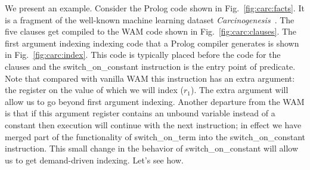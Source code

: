 \documentclass{llncs}
\newcommand{\instr}[1]{\textsf{#1}}
\newcommand{\switchONterm}{\mbox{\instr{switch\_on\_term}}\xspace}
\newcommand{\switchONconstant}{\mbox{\instr{switch\_on\_constant}}\xspace}
\newcommand{\JITI}{demand-driven indexing\xspace}
\begin{document}
We present an example. Consider the Prolog code shown in
Fig.~\ref{fig:carc:facts}. It is a fragment of the well-known machine
learning dataset \textit{Carcinogenesis}~\cite{Carcinogenesis@ILP-97}.
The five clauses get compiled to the WAM code shown in
Fig.~\ref{fig:carc:clauses}. The first argument indexing indexing code
that a Prolog compiler generates is shown in
Fig.~\ref{fig:carc:index}. This code is typically placed before the
code for the clauses and the \switchONconstant instruction is the
entry point of predicate. Note that compared with vanilla WAM this
instruction has an extra argument: the register on the value of which
we will index ($r_1$). The extra argument will allow us to go beyond
first argument indexing. Another departure from the WAM is that if
this argument register contains an unbound variable instead of a
constant then execution will continue with the next instruction; in
effect we have merged part of the functionality of \switchONterm into
the \switchONconstant instruction. This small change in the behavior
of \switchONconstant will allow us to get \JITI. Let's see how.
\end{document}
